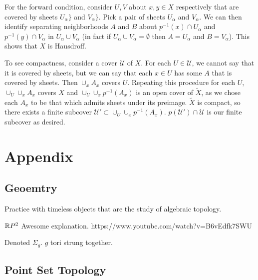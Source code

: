 \documentclass[10pt]{article}
\begin{document}
\begin{solution}

	For the forward condition, consider $U, V$ about $x, y \in X$ respectively
	that are covered by sheets $U_{\alpha}\}$ and $V_{\alpha}\}$. Pick a pair of sheets
	$U_{\alpha}$ and $V_{\alpha}$. We can then identify separating neighborhoods
	$A$ and $B$ about $p^{-1}(x) \cap U_{\alpha}$ and $p^{-1}(y) \cap V_{\alpha}$
	in $U_{\alpha} \cup V_{\alpha}$ (in fact if $U_{\alpha} \cup V_{\alpha} =
	\emptyset$ then $A = U_{\alpha}$ and $B = V_{\alpha}$). This shows that $X$
	is Hausdroff.

	To see compactness, consider a cover $\mathcal{U}$ of $X$. For each $U \in
	\mathcal{U}$, we cannot say that it is covered by sheets, but we can say that
	each $x \in U$ has some $A$ that is covered by sheets. Then $\cup_x A_x$
	covers $U$. Repeating this procedure for each $U$, $\cup_U \cup_x A_x$ covers $X$ and $\cup_U \cup_x p^{-1}(A_x)$ is an open cover of $\tilde{X}$, as we chose each $A_x$ to be that which admits sheets under its preimage. $\tilde{X}$ is compact, so there exists a finite subcover $\mathcal{U'} \subset \cup_U \cup_x
	p^{-1}(A_x)$. $p(\mathcal{U'}) \cap \mathcal{U}$ is our finite subcover as
	desired.

\end{solution}


\section{Appendix}

\subsection{Geoemtry}

Practice with timeless objects that are the study of algebraic topology.

\begin{note}
	$\mathbb{R} P^2$
Awesome explanation. https://www.youtube.com/watch?v=B6vEdfk7SWU
\end{note}

\begin{note}
Denoted $\Sigma_g$. $g$ tori strung together.
\end{note}

\subsection{Point Set Topology}
\end{document}
